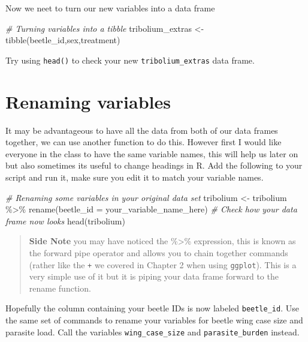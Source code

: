 \documentclass[
]{book}
\newenvironment{Shaded}{\begin{snugshade}}{\end{snugshade}}
\newcommand{\AttributeTok}[1]{\textcolor[rgb]{0.77,0.63,0.00}{#1}}
\newcommand{\CommentTok}[1]{\textcolor[rgb]{0.56,0.35,0.01}{\textit{#1}}}
\newcommand{\FunctionTok}[1]{\textcolor[rgb]{0.00,0.00,0.00}{#1}}
\newcommand{\NormalTok}[1]{#1}
\newcommand{\OtherTok}[1]{\textcolor[rgb]{0.56,0.35,0.01}{#1}}
\newcommand{\SpecialCharTok}[1]{\textcolor[rgb]{0.00,0.00,0.00}{#1}}
\begin{document}
Now we neet to turn our new variables into a data frame

\begin{Shaded}
\begin{Highlighting}[]
\CommentTok{\# Turning variables into a tibble}
\NormalTok{tribolium\_extras }\OtherTok{\textless{}{-}} \FunctionTok{tibble}\NormalTok{(beetle\_id,sex,treatment)}
\end{Highlighting}
\end{Shaded}

Try using \texttt{head()} to check your new \texttt{tribolium\_extras} data frame.

\hypertarget{renaming}{%
\section{Renaming variables}\label{renaming}}

It may be advantageous to have all the data from both of our data frames together, we can use another function to do this. However first I would like everyone in the class to have the same variable names, this will help us later on but also sometimes its useful to change headings in R. Add the following to your script and run it, make sure you edit it to match your variable names.

\begin{Shaded}
\begin{Highlighting}[]
\CommentTok{\# Renaming some variables in your original data set}
\NormalTok{tribolium }\OtherTok{\textless{}{-}}\NormalTok{ tribolium }\SpecialCharTok{\%\textgreater{}\%}
  \FunctionTok{rename}\NormalTok{(}\AttributeTok{beetle\_id =}\NormalTok{ your\_variable\_name\_here)}
\CommentTok{\# Check how your data frame now looks}
\FunctionTok{head}\NormalTok{(tribolium) }
\end{Highlighting}
\end{Shaded}

\begin{quote}
\textbf{Side Note} you may have noticed the \%\textgreater\% expression, this is known as the forward pipe operator and allows you to chain together commands (rather like the \texttt{+} we covered in Chapter 2 when using \texttt{ggplot}). This is a very simple use of it but it is piping your data frame forward to the rename function.
\end{quote}

Hopefully the column containing your beetle IDs is now labeled \texttt{beetle\_id}. Use the same set of commands to rename your variables for beetle wing case size and parasite load. Call the variables \texttt{wing\_case\_size} and \texttt{parasite\_burden} instead.
\end{document}
